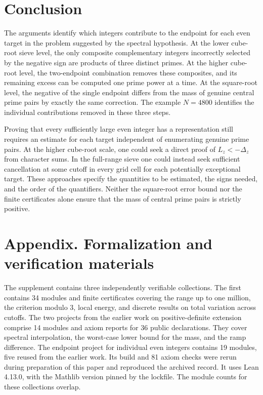 \documentclass[11pt,a4paper]{article}
\begin{document}
\section{Conclusion}

The arguments identify which integers contribute to the endpoint for each even target in the problem suggested by the spectral hypothesis. At the lower cube-root sieve level, the only composite complementary integers incorrectly selected by the negative sign are products of three distinct primes. At the higher cube-root level, the two-endpoint combination removes these composites, and its remaining excess can be computed one prime power at a time. At the square-root level, the negative of the single endpoint differs from the mass of genuine central prime pairs by exactly the same correction. The example $N=4800$ identifies the individual contributions removed in these three steps.

Proving that every sufficiently large even integer has a representation still requires an estimate for each target independent of enumerating genuine prime pairs. At the higher cube-root scale, one could seek a direct proof of $L_z<-\Delta_z$ from character sums. In the full-range sieve one could instead seek sufficient cancellation at some cutoff in every grid cell for each potentially exceptional target. These approaches specify the quantities to be estimated, the signs needed, and the order of the quantifiers. Neither the square-root error bound nor the finite certificates alone ensure that the mass of central prime pairs is strictly positive.

\section*{Appendix. Formalization and verification materials}

The supplement contains three independently verifiable collections. The first contains 34 modules and finite certificates covering the range up to one million, the criterion modulo 3, local energy, and discrete results on total variation across cutoffs. The two projects from the earlier work on positive-definite extension comprise 14 modules and axiom reports for 36 public declarations. They cover spectral interpolation, the worst-case lower bound for the mass, and the ramp difference. The endpoint project for individual even integers contains 19 modules, five reused from the earlier work. Its build and 81 axiom checks were rerun during preparation of this paper and reproduced the archived record. It uses Lean 4.13.0, with the Mathlib version pinned by the lockfile. The module counts for these collections overlap.
\end{document}
